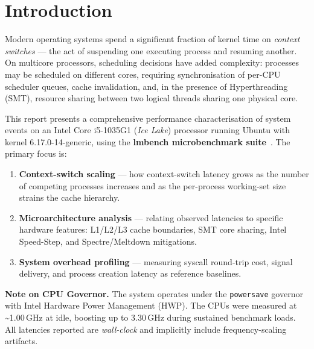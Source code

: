 \documentclass[12pt,a4paper]{article}
\begin{document}
\tableofcontents
\clearpage

\section{Introduction}
\label{sec:intro}

Modern operating systems spend a significant fraction of kernel time on
\textit{context switches} — the act of suspending one executing process and
resuming another. On multicore processors, scheduling decisions have added
complexity: processes may be scheduled on different cores, requiring
synchronisation of per-CPU scheduler queues, cache invalidation, and, in the
presence of Hyperthreading (SMT), resource sharing between two logical threads
sharing one physical core.

This report presents a comprehensive performance characterisation of system
events on an Intel Core i5-1035G1 (\textit{Ice Lake}) processor running
Ubuntu with kernel 6.17.0-14-generic, using the
\textbf{lmbench microbenchmark suite}~\cite{lmbench}. The primary focus is:

\begin{enumerate}[label=\arabic*.]
    \item \textbf{Context-switch scaling} — how context-switch latency grows
    as the number of competing processes increases and as the per-process
    working-set size strains the cache hierarchy.
    \item \textbf{Microarchitecture analysis} — relating observed latencies to
    specific hardware features: L1/L2/L3 cache boundaries, SMT core sharing,
    Intel Speed-Step, and Spectre/Meltdown mitigations.
    \item \textbf{System overhead profiling} — measuring syscall round-trip
    cost, signal delivery, and process creation latency as reference baselines.
\end{enumerate}

\begin{noteboxblue}
\textbf{Note on CPU Governor.} The system operates under the
\texttt{powersave} governor with Intel Hardware Power Management (HWP).
The CPUs were measured at \textasciitilde{}1.00\,GHz at idle, boosting up to
3.30\,GHz during sustained benchmark loads. All latencies reported are
\textit{wall-clock} and implicitly include frequency-scaling artifacts.
\end{noteboxblue}
\end{document}
